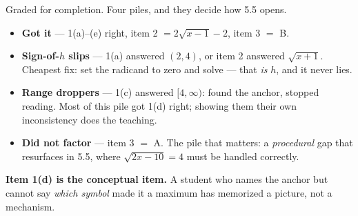 \documentclass[10pt]{article}
\begin{document}
\begin{teachernote}
\small Graded for completion. Four piles, and they decide how 5.5 opens.
\begin{itemize}[leftmargin=1.3em, nosep]
  \item \textbf{Got it} --- 1(a)--(e) right, item 2 $=2\sqrt{x-1}-2$, item 3 $=$ B.
  \item \textbf{Sign-of-$h$ slips} --- 1(a) answered $(2,4)$, or item 2 answered $\sqrt{x+1}$.
        Cheapest fix: set the radicand to zero and solve --- that \emph{is} $h$, and it never lies.
  \item \textbf{Range droppers} --- 1(c) answered $[4,\infty)$: found the anchor, stopped reading.
        Most of this pile got 1(d) right; showing them their own inconsistency does the teaching.
  \item \textbf{Did not factor} --- item 3 $=$ A. The pile that matters: a \emph{procedural} gap that
        resurfaces in 5.5, where $\sqrt{2x-10}=4$ must be handled correctly.
\end{itemize}
\textbf{Item 1(d) is the conceptual item.} A student who names the anchor but cannot say \emph{which
symbol} made it a maximum has memorized a picture, not a mechanism.
\end{teachernote}
\end{document}
